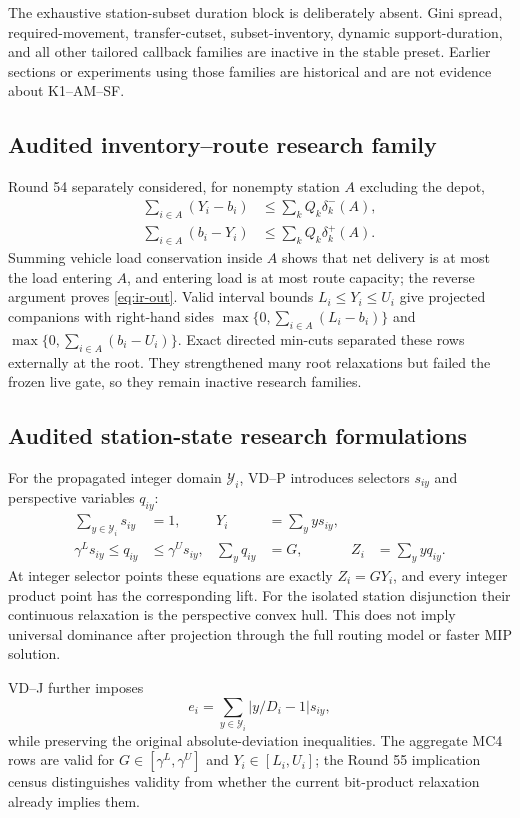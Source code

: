 The exhaustive station-subset duration block is deliberately absent. Gini
spread, required-movement, transfer-cutset, subset-inventory, dynamic
support-duration, and all other tailored callback families are inactive in the
stable preset. Earlier sections or experiments using those families are
historical and are not evidence about K1--AM--SF.

\subsection{Audited inventory--route research family}
Round 54 separately considered, for nonempty station $A$ excluding the depot,
\begin{align}
\sum_{i\in A}(Y_i-b_i)&\leq\sum_k Q_k\delta_k^-(A),\label{eq:ir-in}\\
\sum_{i\in A}(b_i-Y_i)&\leq\sum_k Q_k\delta_k^+(A).\label{eq:ir-out}
\end{align}
Summing vehicle load conservation inside $A$ shows that net delivery is at
most the load entering $A$, and entering load is at most route capacity; the
reverse argument proves \eqref{eq:ir-out}. Valid interval bounds
$L_i\leq Y_i\leq U_i$ give projected companions with right-hand sides
$\max\{0,\sum_{i\in A}(L_i-b_i)\}$ and
$\max\{0,\sum_{i\in A}(b_i-U_i)\}$. Exact directed min-cuts separated these
rows externally at the root. They strengthened many root relaxations but
failed the frozen live gate, so they remain inactive research families.

\subsection{Audited station-state research formulations}
For the propagated integer domain $\mathcal Y_i$, VD--P introduces selectors
$s_{iy}$ and perspective variables $q_{iy}$:
\begin{align}
 \sum_{y\in\mathcal Y_i}s_{iy}&=1,&
 Y_i&=\sum_y y s_{iy},\\
 \gamma^L s_{iy}\le q_{iy}&\le\gamma^U s_{iy},&
 \sum_y q_{iy}&=G,&
 Z_i&=\sum_y yq_{iy}.
\end{align}
At integer selector points these equations are exactly $Z_i=GY_i$, and every
integer product point has the corresponding lift. For the isolated station
disjunction their continuous relaxation is the perspective convex hull. This
does not imply universal dominance after projection through the full routing
model or faster MIP solution.

VD--J further imposes
\begin{equation}
 e_i=\sum_{y\in\mathcal Y_i}|y/D_i-1|s_{iy},
\end{equation}
while preserving the original absolute-deviation inequalities. The aggregate
MC4 rows are valid for $G\in[\gamma^L,\gamma^U]$ and
$Y_i\in[L_i,U_i]$; the Round 55 implication census distinguishes validity from
whether the current bit-product relaxation already implies them.
